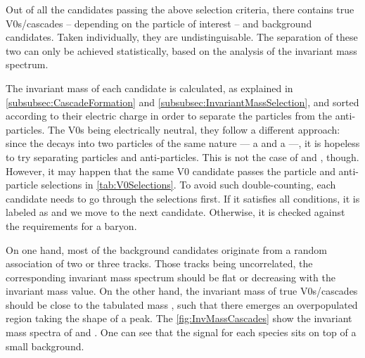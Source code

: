 Out of all the candidates passing the above selection criteria, there contains true V0s/cascades -- depending on the particle of interest -- and background candidates. Taken individually, they are undistinguisable. The separation of these two can only be achieved statistically, based on the analysis of the invariant mass spectrum.

The invariant mass of each candidate is calculated, as explained in \Sec\ref{subsubsec:CascadeFormation} and \Sec\ref{subsubsec:InvariantMassSelection}, and sorted according to their electric charge in order to separate the particles from the anti-particles. The V0s being electrically neutral, they follow a different approach: since the \rmKzeroS decays into two particles of the same nature --- a \rmPiPlus and a \rmPiMinus ---, it is hopeless to try separating particles and anti-particles. This is not the case of \rmLambda and \rmAlambda, though. However, it may happen that the same V0 candidate passes the particle and anti-particle selections in \tab\ref{tab:V0Selections}. To avoid such double-counting, each candidate needs to go through the \rmLambda selections first. If it satisfies all conditions, it is labeled as \rmLambda and we move to the next candidate. Otherwise, it is checked against the requirements for a \rmAlambda baryon.

On one hand, most of the background candidates originate from a random association of two or three tracks. Those tracks being uncorrelated, the corresponding invariant mass spectrum should be flat or decreasing with the invariant mass value. On the other hand, the invariant mass of true V0s/cascades should be close to the tabulated mass \mPDG, such that there emerges an overpopulated region taking the shape of a peak. The \figs\ref{fig:InvMassCascades} show the invariant mass spectra of \rmXi and \rmOmega.  One can see that the signal for each species sits on top of a small background.\\

